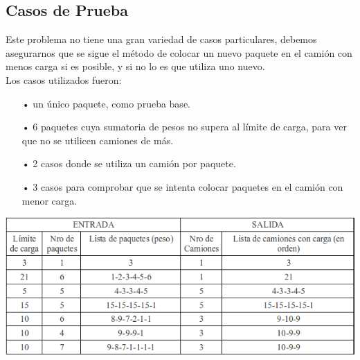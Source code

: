 \subsection{Casos de Prueba}
Este problema no tiene una gran variedad de casos particulares, debemos asegurarnos que se sigue el método de colocar un nuevo paquete en el camión con menos carga si es posible, y si no lo es que utiliza uno nuevo.\\
Los casos utilizados fueron:
\begin{itemize}
\item[•] un único paquete, como prueba base.
\item[•]6 paquetes cuya sumatoria de pesos no supera al límite de carga, para ver que no se utilicen camiones de más.
\item[•]2 casos donde se utiliza un camión por paquete.
\item[•]3 casos para comprobar que se intenta colocar paquetes en el camión con menor carga.
\end{itemize}

\includegraphics[scale=0.9]{ej1/Graficos/tablaPruebas.png} 